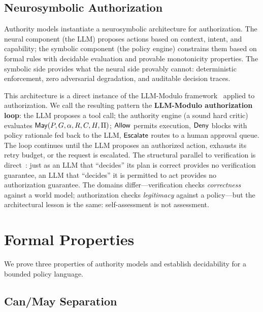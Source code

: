 \documentclass[11pt,a4paper]{article}
\newcommand{\termlabel}[1]{\ifmmode\mathsf{#1}\else{\normalfont\textsc{\MakeLowercase{#1}}}\fi}
\newcommand{\May}{\termlabel{May}}
\newcommand{\Allow}{\termlabel{Allow}}
\newcommand{\Deny}{\termlabel{Deny}}
\newcommand{\Escalate}{\termlabel{Escalate}}
\begin{document}
\subsection{Neurosymbolic Authorization}

Authority models instantiate a neurosymbolic architecture for authorization. The neural component (the LLM) proposes actions based on context, intent, and capability; the symbolic component (the policy engine) constrains them based on formal rules with decidable evaluation and provable monotonicity properties. The symbolic side provides what the neural side provably cannot: deterministic enforcement, zero adversarial degradation, and auditable decision traces.

This architecture is a direct instance of the LLM-Modulo framework~\citep{kambhampati2024llmmodulo} applied to authorization. We call the resulting pattern the \textbf{LLM-Modulo authorization loop}: the LLM proposes a tool call; the authority engine (a sound hard critic) evaluates $\May(P, G, \alpha, R, C, H, \Pi)$; $\Allow$ permits execution, $\Deny$ blocks with policy rationale fed back to the LLM, $\Escalate$ routes to a human approval queue. The loop continues until the LLM proposes an authorized action, exhausts its retry budget, or the request is escalated. The structural parallel to verification is direct~\citep{kambhampati2024llmmodulo}: just as an LLM that ``decides'' its plan is correct provides no verification guarantee, an LLM that ``decides'' it is permitted to act provides no authorization guarantee. The domains differ---verification checks \emph{correctness} against a world model; authorization checks \emph{legitimacy} against a policy---but the architectural lesson is the same: self-assessment is not assessment.


\section{Formal Properties}
\label{sec:properties}

We prove three properties of authority models and establish decidability for a bounded policy language.

\subsection{Can/May Separation}
\end{document}
